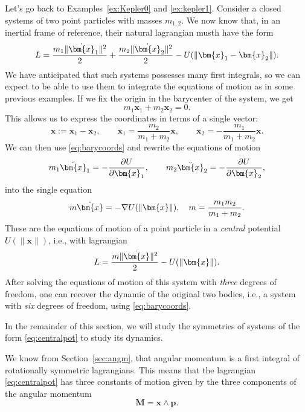 \documentclass[english,fontsize=11pt,paper=a5,oneside]{scrbook}
\newcommand{\bx}{\bm{x}}
\newcommand{\bp}{\bm{p}}
\theoremstyle{definition}
\newenvironment{example}
  {\pushQED{\qed}\renewcommand{\qedsymbol}{$\lozenge$}\examplex}
  {\popQED\endexamplex}
\begin{document}
\begin{example}[The two-body problem]\label{ex:kepler2}
  Let's go back to Examples~\ref{ex:Kepler0} and \ref{ex:kepler1}.
  Consider a closed systems of two point particles with masses $m_{1,2}$.
  We now know that, in an inertial frame of reference, their natural lagrangian musth have the form
  \begin{equation}
    L = \frac{m_1 \|\dot\bx_1\|^2}{2} + \frac{m_2 \|\dot\bx_2\|^2}{2} - U(\|\bx_1 - \bx_2\|).
  \end{equation}
  We have anticipated that such systems possesses many first integrals, so we can expect to be able to use them to integrate the equations of motion as in some previous examples.
  If we fix the origin in the barycenter of the system, we get
  \begin{equation}
    m_1 \bx_1 + m_2 \bx_2 = 0.
  \end{equation}
  This allows us to express the coordinates in terms of a single vector:
  \begin{equation}\label{eq:barycoords}
    \bx := \bx_1 - \bx_2, \qquad
    \bx_1 = \frac{m_2}{m_1 + m_2} \bx, \qquad
    \bx_2 = -\frac{m_1}{m_1 + m_2} \bx.
  \end{equation}
  We can then use \eqref{eq:barycoords} and rewrite the equations of motion
  \begin{equation}
    m_1 \ddot \bx_1 = -\frac{\partial U}{\partial \bx_1}, \qquad m_2 \ddot \bx_2 = -\frac{\partial U}{\partial \bx_2},
  \end{equation}
  into the single equation
  \begin{equation}
    m \ddot \bx = -\nabla U(\|\bx\|), \quad m = \frac{m_1m_2}{m_1+m_2}.
  \end{equation}
  These are the equations of motion of a point particle in a \emph{central} potential $U(\|\bx\|)$, i.e., with lagrangian
  \begin{equation}\label{eq:centralpot}
    L = \frac{m \|\dot\bx\|^2}{2} - U(\|\bx\|).
  \end{equation}
  After solving the equations of motion of this system with \emph{three} degrees of freedom, one can recover the dynamic of the original two bodies, i.e., a system with \emph{six} degrees of freedom, using \eqref{eq:barycoords}.
\end{example}

In the remainder of this section, we will study the symmetries of systems of the form \eqref{eq:centralpot} to study its dynamics.

We know from Section~\ref{sec:angm}, that angular momentum is a first integral of rotationally symmetric lagrangians.
This means that the lagrangian \eqref{eq:centralpot} has three constants of motion given by the three components of the angular momentum
\begin{equation}
  \bm{M} = \bx\wedge \bp.
\end{equation}
\end{document}
